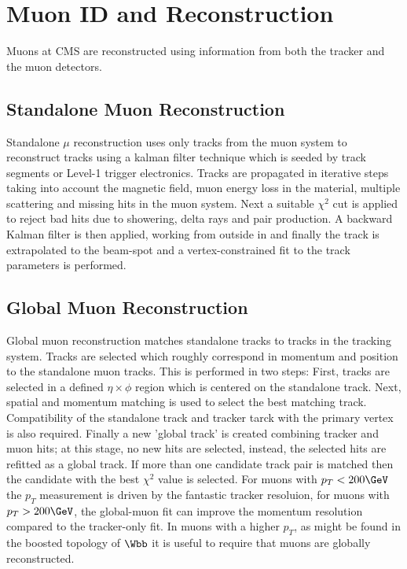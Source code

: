 

\section{Muon ID and Reconstruction}
Muons at CMS are reconstructed using information from both the 
tracker and the muon detectors. 
\subsection{Standalone Muon Reconstruction}
Standalone $\mu$ reconstruction uses only tracks from the muon system
to reconstruct tracks using a kalman filter technique which is seeded
by track segments or Level-1 trigger electronics. Tracks are propagated
in iterative steps taking into account the magnetic field, muon energy loss in the material,
multiple scattering and missing hits in the muon system.
Next a suitable $\chi^{2}$ cut is applied to reject bad hits due to showering,
delta rays and pair production. A backward Kalman filter is then applied,
working from outside in and finally the track is extrapolated to the 
beam-spot and a vertex-constrained fit to the track
parameters is performed.
\subsection{Global Muon Reconstruction}
Global muon reconstruction matches standalone tracks to tracks in the tracking
system. 
Tracks are selected which roughly correspond in momentum and position to 
the standalone muon tracks. This is performed in two steps: First,
tracks are selected in a defined $\eta\times\phi$ region which is centered
on the standalone track. Next, spatial and momentum matching is 
used to select the best matching track. Compatibility of the standalone track and tracker tarck with the
primary vertex is also required. Finally a new 'global track' is created combining
tracker and muon hits; at this stage, no new hits are selected, instead, 
the selected hits are refitted as a global track. If more than one candidate
track pair is matched then the candidate with the best $\chi^{2}$ value
is selected. 
For muons with $p_{T}<200\GeV$ the $p_{T}$ measurement is driven
by the fantastic tracker resoluion, for muons with $p_{T}>200\GeV$,
the global-muon fit can improve the momentum resolution compared
to the tracker-only fit.
In muons with a higher $p_{T}$, as might be found
in the boosted topology of $\Wbb$ it is useful to require that muons
are globally reconstructed.
